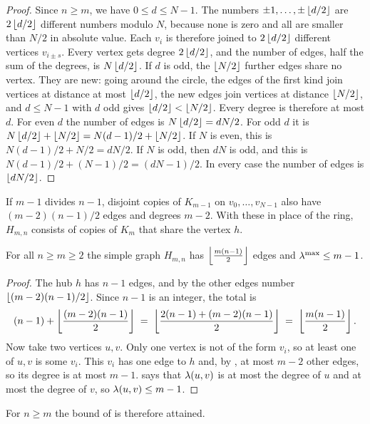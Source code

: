 \begin{proof}
Since $n\ge m$, we have $0\le d\le N-1$.
The numbers $\pm1,\dots,\pm\left\lfloor d/2 \right\rfloor$ are $2\left\lfloor d/2 \right\rfloor$ different numbers modulo $N$, because none is zero and all are smaller than $N/2$ in absolute value. Each $v_i$ is therefore joined to $2\left\lfloor d/2 \right\rfloor$ different vertices $v_{i\pm s}$. Every vertex gets degree $2\left\lfloor d/2 \right\rfloor$, and the number of edges, half the sum of the degrees, is $N\left\lfloor d/2 \right\rfloor$.
If $d$ is odd, the $\left\lfloor N/2 \right\rfloor$ further edges share no vertex.
They are new: going around the circle, the edges of the first kind join vertices at distance at most $\left\lfloor d/2 \right\rfloor$, the new edges join vertices at distance $\left\lfloor N/2 \right\rfloor$, and $d\le N-1$ with $d$ odd gives $\left\lfloor d/2 \right\rfloor<\left\lfloor N/2 \right\rfloor$.
Every degree is therefore at most $d$.
For even $d$ the number of edges is $N\left\lfloor d/2 \right\rfloor=dN/2$.
For odd $d$ it is $N\left\lfloor d/2 \right\rfloor+\left\lfloor N/2 \right\rfloor=N(d-1)/2+\left\lfloor N/2 \right\rfloor$. If $N$ is even, this is $N(d-1)/2+N/2=dN/2$. If $N$ is odd, then $dN$ is odd, and this is $N(d-1)/2+(N-1)/2=(dN-1)/2$.
In every case the number of edges is $\left\lfloor dN/2 \right\rfloor$.
\end{proof}

If $m-1$ divides $n-1$, disjoint copies of $K_{m-1}$ on $v_0,\dots,v_{N-1}$ also have $(m-2)(n-1)/2$ edges and degrees $m-2$. With these in place of the ring, $H_{m,n}$ consists of copies of $K_m$ that share the vertex $h$.

\begin{theorem}\label{thm:extremal-existence}
For all $n \ge m \ge 2$ the simple graph $H_{m,n}$ has $\left\lfloor \frac{m(n-1)}{2} \right\rfloor$ edges and $\lambda^{\max} \le m-1$.
\end{theorem}

\begin{proof}
The hub $h$ has $n-1$ edges, and by  the other edges number $\left\lfloor (m-2)(n-1)/2 \right\rfloor$.
Since $n-1$ is an integer, the total is
\[
    (n-1) + \left\lfloor \frac{(m-2)(n-1)}{2} \right\rfloor \;=\; \left\lfloor \frac{2(n-1) + (m-2)(n-1)}{2} \right\rfloor \;=\; \left\lfloor \frac{m(n-1)}{2} \right\rfloor.
\]
Now take two vertices $u,v$. Only one vertex is not of the form $v_i$, so at least one of $u,v$ is some $v_i$.
This $v_i$ has one edge to $h$ and, by , at most $m-2$ other edges, so its degree is at most $m-1$.
 says that $\lambda(u,v)$ is at most the degree of $u$ and at most the degree of $v$, so $\lambda(u,v) \le m-1$.
\end{proof}

For $n\ge m$ the bound of  is therefore attained.

